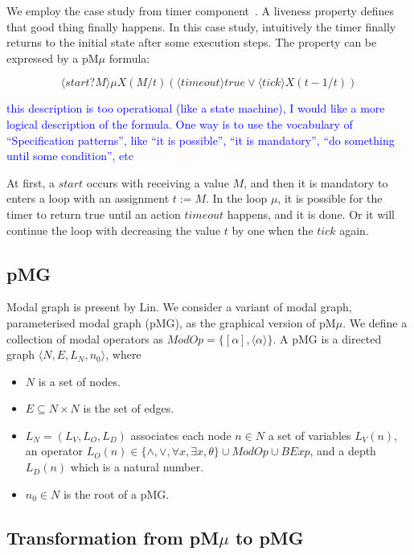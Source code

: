 \documentclass[runningheads,a4paper]{llncs}
\newcommand{\ERIC}[1]{\textcolor{blue}{#1}}
\begin{document}
We employ the case study from timer component~\cite{mavridou2016architectrue}. A liveness property defines that good thing finally happens. In this case study, intuitively the timer finally returns to the initial state after some execution steps. The property can be expressed by a pM$\mu$ formula:

\begin{equation}\label{formula1}
	\langle start?M\rangle\mu X(M/t)(\langle timeout\rangle true \vee \langle tick\rangle X(t-1/t))
\end{equation}


\ERIC{this description is too operational (like a state machine), I would like a more logical description of the formula. One way is to use the vocabulary of ``Specification patterns'', like ``it is possible'', ``it is mandatory'', ``do something until some condition'', etc}

At first, a $start$ occurs with receiving a value $M$, and then it is mandatory to enters a loop with an assignment $t := M$.  In the loop $\mu$, it is possible for the timer to return true until an action $timeout$ happens, and it is done. Or it will continue the loop with decreasing the value $t$ by one when the $tick$ again.


\subsection{pMG}

Modal graph is present by Lin\cite{lin2001modal}. We consider a variant of modal graph, parameterised modal graph (pMG), as the graphical version of pM$\mu$. We define a collection of modal operators as $ModOp = \{[\alpha], \langle\alpha\rangle\}$. A pMG is a directed graph $\langle N, E, L_{N}, n_{0}\rangle$, where
\begin{itemize}
	\item $N$ is a set of nodes.
	\item $E \subseteq N\times N$ is the set of edges.
	\item $L_{N} = (L_{V}, L_{O}, L_{D})$ associates each node $n\in N$ a set of variables $L_{V}(n)$, an operator $L_{O}(n)\in\{\wedge, \vee, \forall x, \exists x, \theta\}\cup ModOp \cup BExp$, and a depth $L_{D}(n)$ which is a natural number.
	\item $n_{0} \in N$ is the root of a pMG.
\end{itemize}



\subsection{Transformation from pM$\mu$ to pMG}
\end{document}
